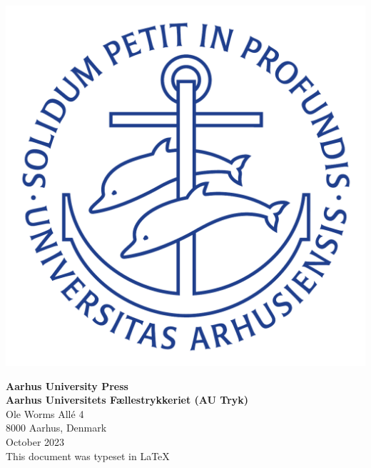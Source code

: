 \vspace*{\fill}
\begin{minipage}[b]{0.48\textwidth}
	\vspace*{0pt}			%
	\includegraphics[width=0.1\paperwidth]{figs/logos/ausegl_blaa.pdf}
\end{minipage}
\hfill
\begin{minipage}[b]{0.4\textwidth}
    \begin{flushright}
        {\small 
        \textbf{Aarhus University Press \\
        Aarhus Universitets Fællestrykkeriet (AU Tryk)} \\
        Ole Worms Allé 4 \\
        8000 Aarhus, Denmark \\
        October 2023 \\
        This document was typeset in \LaTeX}
    \end{flushright}
\end{minipage}
\BgThispage  %
